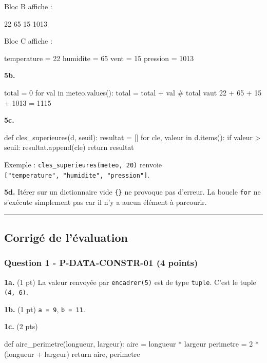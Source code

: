 Bloc B affiche :

\begin{python}
22
65
15
1013
\end{python}

Bloc C affiche :

\begin{python}
temperature = 22
humidite = 65
vent = 15
pression = 1013
\end{python}

\textbf{5b.}

\begin{python}
total = 0
for val in meteo.values():
    total = total + val
# total vaut 22 + 65 + 15 + 1013 = 1115
\end{python}

\textbf{5c.}

\begin{python}
def cles_superieures(d, seuil):
    resultat = []
    for cle, valeur in d.items():
        if valeur > seuil:
            resultat.append(cle)
    return resultat
\end{python}

Exemple : \texttt{cles\_superieures(meteo,\ 20)} renvoie
\texttt{{[}"temperature",\ "humidite",\ "pression"{]}}.

\textbf{5d.} Itérer sur un dictionnaire vide \texttt{\{\}} ne provoque
pas d'erreur. La boucle \texttt{for} ne s'exécute simplement pas car il
n'y a aucun élément à parcourir.

\begin{center}\rule{0.5\linewidth}{0.5pt}\end{center}

\subsection{Corrigé de l’évaluation}

\subsubsection{Question 1 - P-DATA-CONSTR-01 (4 points)}

\textbf{1a.} (1 pt) La valeur renvoyée par \texttt{encadrer(5)} est de
type \texttt{tuple}. C'est le tuple \texttt{(4,\ 6)}.

\textbf{1b.} (1 pt) \texttt{a\ =\ 9}, \texttt{b\ =\ 11}.

\textbf{1c.} (2 pts)

\begin{python}
def aire_perimetre(longueur, largeur):
    aire = longueur * largeur
    perimetre = 2 * (longueur + largeur)
    return aire, perimetre
\end{python}

